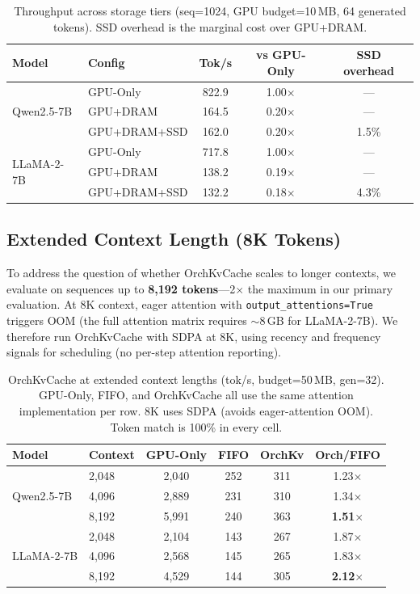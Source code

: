 \documentclass[conference]{IEEEtran}
\begin{document}
\begin{table}[t]
\centering
\caption{Throughput across storage tiers (seq=1024, GPU budget=10\,MB, 64 generated tokens). SSD overhead is the marginal cost over GPU+DRAM.}
\label{tab:tier-throughput}
\small
\begin{tabular}{@{}llccc@{}}
\toprule
Model & Config & Tok/s & vs GPU-Only & SSD overhead \\
\midrule
\multirow{3}{*}{Qwen2.5-7B}
  & GPU-Only       & 822.9 & 1.00$\times$ & --- \\
  & GPU+DRAM       & 164.5 & 0.20$\times$ & --- \\
  & GPU+DRAM+SSD   & 162.0 & 0.20$\times$ & 1.5\% \\
\midrule
\multirow{3}{*}{LLaMA-2-7B}
  & GPU-Only       & 717.8 & 1.00$\times$ & --- \\
  & GPU+DRAM       & 138.2 & 0.19$\times$ & --- \\
  & GPU+DRAM+SSD   & 132.2 & 0.18$\times$ & 4.3\% \\
\bottomrule
\end{tabular}
\end{table}

\subsection{Extended Context Length (8K Tokens)}
\label{sec:scale}

To address the question of whether OrchKvCache scales to longer contexts, we evaluate on sequences up to \textbf{8{,}192 tokens}---2$\times$ the maximum in our primary evaluation. At 8K context, eager attention with \texttt{output\_attentions=True} triggers OOM (the full attention matrix requires ${\sim}$8\,GB for LLaMA-2-7B). We therefore run OrchKvCache with SDPA at 8K, using recency and frequency signals for scheduling (no per-step attention reporting).

\begin{table}[t]
\centering
\caption{OrchKvCache at extended context lengths (tok/s, budget=50\,MB, gen=32). GPU-Only, FIFO, and OrchKvCache all use the same attention implementation per row. 8K uses SDPA (avoids eager-attention OOM). Token match is 100\% in every cell.}
\label{tab:scale}
\small
\begin{tabular}{@{}llcccc@{}}
\toprule
Model & Context & GPU-Only & FIFO & OrchKv & Orch/FIFO \\
\midrule
\multirow{3}{*}{Qwen2.5-7B}
  & 2{,}048  & 2{,}040 & 252  & 311  & 1.23$\times$ \\
  & 4{,}096  & 2{,}889 & 231  & 310  & 1.34$\times$ \\
  & 8{,}192  & 5{,}991 & 240  & 363  & \textbf{1.51$\times$} \\
\midrule
\multirow{3}{*}{LLaMA-2-7B}
  & 2{,}048  & 2{,}104 & 143  & 267  & 1.87$\times$ \\
  & 4{,}096  & 2{,}568 & 145  & 265  & 1.83$\times$ \\
  & 8{,}192  & 4{,}529 & 144  & 305  & \textbf{2.12$\times$} \\
\bottomrule
\end{tabular}
\end{table}
\end{document}
